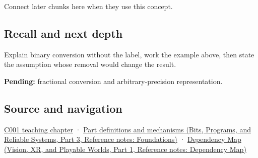\hypertarget{appendix-dc552784a2c0-used-by}{}

Connect later chunks here when they use this concept.

\subsection{Recall and next depth}\label{appendix-dc552784a2c0-recall-and-next-depth}

\hypertarget{appendix-dc552784a2c0-recall-and-next-depth}{}

Explain binary conversion without the label, work the example above, then state the assumption whose removal would change the result.

\textbf{Pending:} fractional conversion and arbitrary-precision representation.

\subsection{Source and navigation}\label{appendix-dc552784a2c0-source-and-navigation}

\hypertarget{appendix-dc552784a2c0-source-and-navigation}{}

\hyperref[01-foundations-i-ch001-from-a-signal-to-an-interpretation]{C001 teaching chapter} · \href{../01-Bits-Programs-and-Reliable-Systems-P03/main.pdf\#appendix-fd090d982a15}{Part definitions and mechanisms (Bits, Programs, and Reliable Systems, Part 3, Reference notes: Foundations)} · \href{../07-Vision-XR-and-Playable-Worlds-P01/main.pdf\#appendix-4ad47bdd269a}{Dependency Map (Vision, XR, and Playable Worlds, Part 1, Reference notes: Dependency Map)}
